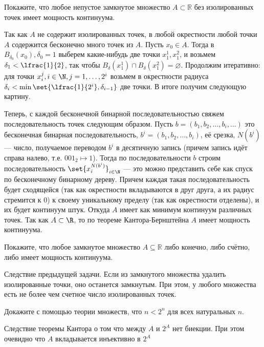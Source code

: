 \documentclass[a4paper,12pt,twoside]{article}
\begin{document}
\begin{?}
    Покажите, что любое непустое замкнутое множество \(A \subset \mathbb R\) без изолированных точек имеет мощность континуума.
\end{?}
\begin{solution}{}
    Так как \(A\) не содержит изолированных точек, в любой окрестности любой точки \(A\) содержится бесконечно много точек из \(A\). Пусть \(x_0 \in A\). Тогда в \(B_{\delta_0}(x_0), \delta_0 = 1\) выберем какие-нибудь две точки \(x_1^1, x_1^2\), и возьмем \(\delta_1 < \lfrac{1}{2}\), так чтобы \(B_{\delta}(x_1^1) \cap B_{\delta}(x_1^2) = \varnothing\). Продолжим итеративно: для точки \(x_i^j, i \in \mathbb \N, j = 1, \ldots, 2^i\) возьмем в окрестности радиуса \(\delta_i < \min\set{\lfrac{1}{2^i}, \delta_{i - 1}}\) две точки. В итоге получим следующую картину.
    \begin{center}
    \end{center}
    Теперь, с каждой бесконечной бинарной последовательностью свяжем последовательность точек следующим образом. Пусть \(b = (b_1, b_2, \ldots, b_i, \ldots)\) это бесконечная бинарная последовательность, \(b^{i} = (b_1, b_2, \ldots, b_i)\), её срезка, \(N(b^i)\) --- число, получаемое переводом \(b^{i}\) в десятичную запись (причем запись идёт справа налево, т.е. \(001_2 \mapsto 1\)). Тогда по последовательности \(b\) строим последовательность \(\set{x_i^{N(b^i)}}_{i \in \mathbb \N}\) --- это можно представить себе как спуск по бесконечному бинарному дереву. Причем каждая такая последовательность будет сходящейся (так как окрестности вкладываются в друг друга, а их радиус стремится к 0) к своему уникальному пределу (так как окрестности отделены), и их будет континуум штук. Откуда \(A\) имеет как минимум континуум различных точек. Так как \(A \subset \R\), то по теореме Кантора-Бернштейна \(A\) имеет мощность континуума.
\end{solution}
\begin{?}
    Покажите, что любое замкнутое множество \(A \subseteq \mathbb R\) либо конечно, либо счётно, либо имеет мощность континуума.
\end{?}
\begin{solution}{}
    Следствие предыдущей задачи. Если из замкнутого множества удалить изолированные точки, оно останется замкнутым. При этом, у любого множества есть не более чем счетное число изолированных точек. 
\end{solution}
\begin{?}
    Докажите с помощью теории множеств, что \(n < 2^n\) для всех натуральных \(n\).
\end{?}
\begin{solution}{}
    Следствие теоремы Кантора о том что между \(A\) и \(2^A\) нет биекции. При этом очевидно что \(A\) вкладывается инъективно в \(2^A\)
\end{solution}
\end{document}
